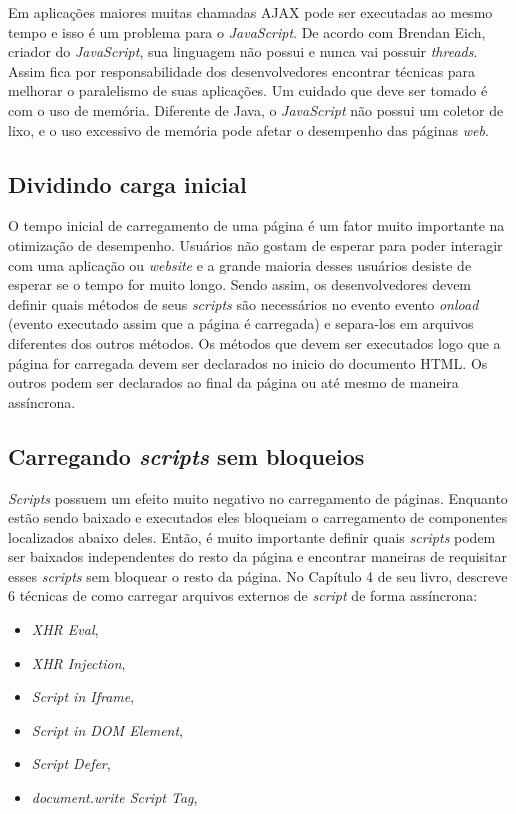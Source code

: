 Em aplicações maiores muitas chamadas AJAX pode ser executadas ao mesmo tempo e isso é um problema para o \textit{JavaScript}. De acordo com Brendan Eich, criador do \textit{JavaScript}, sua linguagem não possui e nunca vai possuir \textit{threads}. Assim fica por responsabilidade dos desenvolvedores encontrar técnicas para melhorar o paralelismo de suas aplicações. Um cuidado que deve ser tomado é com o uso de memória. Diferente de Java, o \textit{JavaScript} não possui um coletor de lixo, e o uso excessivo de memória pode afetar o desempenho das páginas \textit{web}.

\subsection{Dividindo carga inicial}
\label{subsec:evenfaster_cap3}
O tempo inicial de carregamento de uma página é um fator muito importante na otimização de desempenho. Usuários não gostam de esperar para poder interagir com uma aplicação ou \textit{website} e a grande maioria desses usuários desiste de esperar se o tempo for muito longo. Sendo assim, os desenvolvedores devem definir quais métodos de seus \textit{scripts} são necessários no evento evento \textit{onload} (evento executado assim que a página é carregada) e separa-los em arquivos diferentes dos outros métodos. Os métodos que devem ser executados logo que a página for carregada devem ser declarados no inicio do documento HTML. Os outros podem ser declarados ao final da página ou até mesmo de maneira assíncrona.

\subsection{Carregando \textit{scripts} sem bloqueios}
\label{subsec:evenfaster_cap4}
\textit{Scripts} possuem um efeito muito negativo no carregamento de páginas. Enquanto estão sendo baixado e executados eles bloqueiam o carregamento de componentes localizados abaixo deles. Então, é muito importante definir quais \textit{scripts} podem ser baixados independentes do resto da página e encontrar maneiras de requisitar esses \textit{scripts} sem bloquear o resto da página. No Capítulo 4 de seu livro,  descreve 6 técnicas de como carregar arquivos externos de \textit{script} de forma assíncrona:

\begin{itemize}
	\item \textit{XHR Eval}, \cite[p.~29]{EvenFaster}
	\item \textit{XHR Injection}, \cite[p.~31]{EvenFaster}
	\item \textit{Script in Iframe}, \cite[p.~31]{EvenFaster}
	\item \textit{Script in DOM Element}, \cite[p.~32]{EvenFaster}
	\item \textit{Script Defer}, \cite[p.~32]{EvenFaster}
	\item \textit{document.write Script Tag}, \cite[p.~33]{EvenFaster}
\end{itemize}

